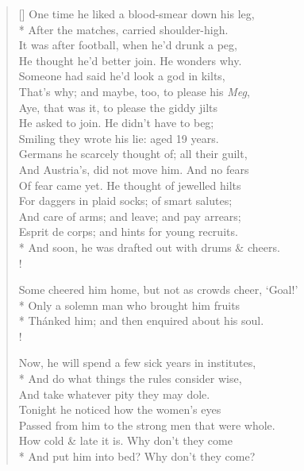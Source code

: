 \documentclass[MAIN]{subfiles}
\begin{document}
\begin{verse}[\versewidth]
One time he liked a blood-smear down his leg,\\*
After the matches, carried shoulder-high.\\
It was after football, when he'd drunk a peg,\\
He thought he'd better join. He wonders why.\\
Someone had said he'd look a god in kilts,\\
That's why; and maybe, too, to please his \emph{Meg},\\
Aye, that was it, to please the giddy jilts\\
He asked to join. He didn't have to beg;\\
Smiling they wrote his lie: aged 19 years.\\
Germans he scarcely thought of; all their guilt,\\
And Austria's, did not move him. And no fears\\
Of fear came yet. He thought of jewelled hilts\\
For daggers in plaid socks; of smart salutes;\\
And care of arms; and leave; and pay arrears;\\
{\hge Esprit de corps}; and hints for young recruits.\\*
And soon, he was drafted out with drums \& cheers.\\!

Some cheered him home, but not as crowds cheer, `Goal!'\\*
Only a solemn man who brought him fruits\\*
Th\'anked him; and then enquired about his soul.\\!

Now, he will spend a few sick years in institutes,\\*
And do what things the rules consider wise,\\
And take whatever pity they may dole.\\
Tonight he noticed how the women's eyes\\
Passed from him to the strong men that were whole.\\
How cold \& late it is. Why don't they come\\*
And put him into bed? Why don't they come?
\end{verse}
\end{document}
